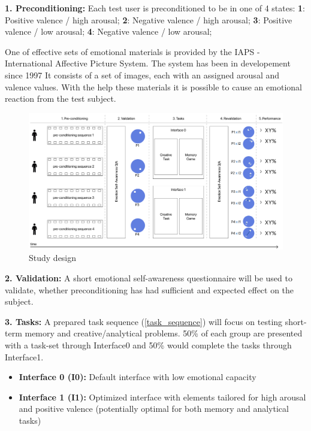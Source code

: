 \textbf{1. Preconditioning:} Each test user is preconditioned to be in one of 4 states:
 \textbf{1}: Positive valence / high arousal; 
 \textbf{2}: Negative valence / high arousal;
 \textbf{3}: Positive valence / low arousal;
 \textbf{4}: Negative valence / low arousal;

One of effective sets of emotional materials is provided by the IAPS - International Affective Picture System. The system has been in developement since 1997 \cite{Lang1997} It consists of a set of images, each with an assigned arousal and valence values. With the help these materials it is possible to cause an emotional reaction from the test subject.

\begin{figure}
	\begin{center}
		\includegraphics[width=1\textwidth]{images/study_design5.png}
		\caption{Study design\label{fig:scaled_diss}}
	\end{center}
\end{figure}

\textbf{2. Validation:} A short emotional self-awareness questionnaire will be used to validate, whether preconditioning has had sufficient and expected effect on the subject.

\textbf{3. Tasks:} A prepared task sequence (\ref{task_sequence}) will focus on testing short-term memory and creative/analytical problems. 
50\% of each group are presented with a task-set through Interface0 and 50\% would complete the tasks through Interface1.

\begin{itemize}
	\item \textbf{Interface 0 (I0):} Default interface with low emotional capacity
	\item \textbf{Interface 1 (I1):} Optimized interface with elements tailored for high arousal and positive valence (potentially optimal for both memory and analytical tasks) \cite[pp. 81 ff]{Brave2002} \cite{Heidig2015}
\end{itemize}

